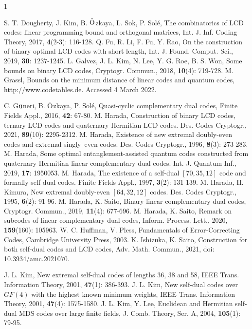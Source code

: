 \documentclass[12pt,twoside]{article}
\theoremstyle{plain}
\theoremstyle{definition}
\theoremstyle{remark}
\begin{document}
\begin{thebibliography}{1}

 S. T. Dougherty, J. Kim, B. $\ddot{{\rm O}}$zkaya, L. Sok, P. Sol\'e, The combinatorics of LCD codes: linear programming bound and orthogonal matrices, Int. J. Inf. Coding Theory, 2017, \textbf{4}(2-3): 116-128.
 Q. Fu, R. Li, F. Fu, Y. Rao, On the construction of binary optimal LCD codes with short length, Int. J. Found. Comput. Sci., 2019, {\bf30}: 1237-1245.
 L. Galvez, J. L. Kim, N. Lee, Y. G. Roe, B. S. Won, Some bounds
on binary LCD codes, Cryptogr. Commun., 2018, \textbf{10}(4): 719-728.
 M. Grassl, Bounds on the minimum distance of linear codes and quantum codes,
http://www.codetables.de. Accessed 4 March 2022.


 C. G$\ddot{{\rm u}}$neri, B. $\ddot{{\rm O}}$zkaya, P. Sol\'e, Quasi-cyclic complementary dual codes, Finite Fields Appl., 2016, \textbf {42}: 67-80.
 M. Harada, Construction of binary LCD codes, ternary LCD codes and quaternary Hermitian LCD codes. Des. Codes Cryptogr., 2021, {\bf89}(10): 2295-2312.
 M. Harada, Existence of new extremal doubly-even codes and extremal singly--even codes. Des. Codes Cryptogr., 1996, {\bf8}(3): 273-283.
 M. Harada, Some optimal entanglement-assisted quantum codes constructed from quaternary Hermitian linear complementary dual codes. Int. J. Quantum Inf., 2019, {\bf17}: 1950053.
 M. Harada, The existence of a self-dual $[70, 35, 12]$ code and formally self-dual codes. Finite Fields Appl., 1997, {\bf3}(2): 131-139.
 M. Harada, H. Kimura, New extremal doubly-even $[64, 32, 12]$ codes. Des. Codes Cryptogr., 1995, {\bf6}(2): 91-96.
 M. Harada, K. Saito, Binary linear complementary dual codes, Cryptogr. Commun., 2019, \textbf{11}(4): 677-696.
     M. Harada, K. Saito, Remark on subcodes of linear complementary dual codes, Inform. Process. Lett., 2020, {\bf159}(160): 105963.
 W. C. Huffman, V. Pless, Fundamentals of Error-Correcting Codes, Cambridge University Press, 2003.
     K. Ishizuka, K. Saito, Construction for both self-dual codes and LCD codes, Adv. Math. Commun., 2021, doi: 10.3934/amc.2021070.

 J. L. Kim, New extremal self-dual codes of lengths 36, 38 and 58, IEEE Trans. Information Theory, 2001, {\bf47}(1): 386-393.
 J. L. Kim, New self-dual codes over $GF(4)$ with the highest known minimum weights, IEEE Trans. Information Theory, 2001, {\bf47}(4): 1575-1580.
 J. L. Kim, Y. Lee, Euclidean and Hermitian self-dual MDS codes over large finite fields, J. Comb. Theory, Ser. A, 2004, {\bf 105}(1): 79-95.


\end{thebibliography}
\end{document}
